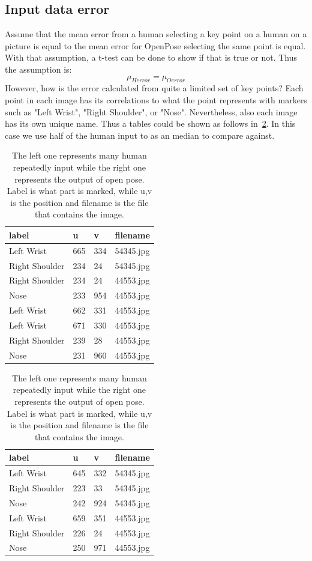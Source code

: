 \subsection{Input data error}\label{sub:implement:inputerror}
Assume that the mean error from a human selecting a key point on a human on a picture is equal to the mean error for OpenPose selecting the same point is equal.
With that assumption, a t-test can be done to show if that is true or not.
Thus the assumption is:
\[
    \mu_{Herror} = \mu_{Oerror}
\]
However, how is the error calculated from quite a limited set of key points?
Each point in each image has its correlations to what the point represents with markers such as "Left Wrist", "Right Shoulder", or "Nose".
Nevertheless, also each image has its own unique name.
Thus a tables could be shown as follows in~\ref{tab:impl:input}.
In this case we use half of the human input to as an median to compare against.
\begin{table}[h]
    \centering
    \begin{tabular}{|llll|}
        label & u & v & filename\\
        \hline
        Left Wrist      & 665 & 334     & 54345.jpg \\
        Right Shoulder  & 234 & 24      & 54345.jpg \\
        Right Shoulder  & 234 & 24      & 44553.jpg \\
        Nose            & 233 & 954     & 44553.jpg \\

        Left Wrist      & 662 & 331     & 44553.jpg \\
        Left Wrist      & 671 & 330     & 44553.jpg \\
        Right Shoulder  & 239 & 28      & 44553.jpg \\
        Nose            & 231 & 960     & 44553.jpg
    \end{tabular}
    \begin{tabular}{|llll|}
        label & u & v & filename\\
        \hline
        Left Wrist      & 645 & 332     & 54345.jpg \\
        Right Shoulder  & 223 & 33      & 54345.jpg \\
        Nose            & 242 & 924     & 54345.jpg \\
       Left Wrist      & 659 & 351     & 44553.jpg \\
       Right Shoulder  & 226 & 24      & 44553.jpg \\
       Nose            & 250 & 971     & 44553.jpg
    \end{tabular}
    \caption[Output data example]{The left one represents many human repeatedly input while the right one represents the output of open pose. Label is what part is marked, while u,v is the position and filename is the file that contains the image.}
    \label{tab:impl:input}
\end{table}
